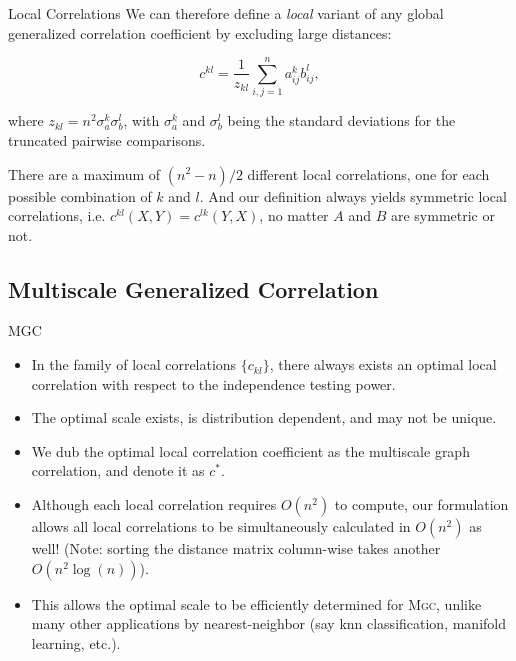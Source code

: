 \documentclass{beamer}
\newcommand{\G}{c}
\providecommand{\sct}[1]{{\normalfont\textsc{#1}}}
\newcommand{\Mgc}{\sct{Mgc}}
\begin{document}
\begin{frame}{Local Correlations}
We can therefore define a \emph{local} variant of any global generalized correlation coefficient by  excluding large distances: 

\pause
\medskip
\begin{equation}
\label{localCoef}
\G^{kl}=\dfrac{1}{z_{kl}} {\textstyle \sum_{i,j=1}^n a_{ij}^k b_{ij}^l},
\end{equation}

\pause
\medskip
where $z_{kl}=n^2 \sigma_a^k \sigma_b^l$,  with $\sigma_a^k$ and $\sigma_b^{l}$ being the standard deviations for the truncated pairwise comparisons. 

\pause
\medskip
There are a maximum of $(n^2-n)/2$ different local correlations, one for each possible combination of $k$ and $l$. And our definition always yields symmetric local correlations, i.e. $\G^{kl}(X,Y)=\G^{lk}(Y,X)$, no matter $A$ and $B$ are symmetric or not.
\end{frame}

\subsection{Multiscale Generalized Correlation}
\begin{frame}{MGC}
\begin{itemize}[<+->]
\item In the family of local correlations $\{\G_{kl}\}$, there always exists an optimal local correlation with respect to the independence testing power. 
\item The optimal scale exists, is distribution dependent, and may not be unique.
\item We dub the optimal local correlation coefficient as the multiscale graph correlation, and denote it as $\G^{*}$.
\item Although each local correlation requires $O(n^2)$ to compute, our formulation allows all local correlations to be simultaneously calculated in $O(n^2)$ as well! (Note: sorting the distance matrix column-wise takes another $O(n^2 \log(n))$).
\item This allows the optimal scale to be efficiently determined for \Mgc, unlike many other applications by nearest-neighbor (say knn classification, manifold learning, etc.).
\end{itemize}
\end{frame}
\end{document}
